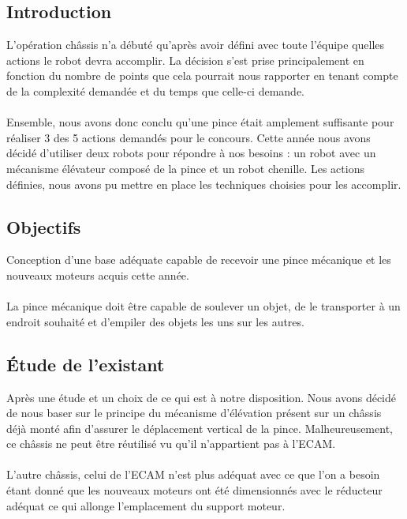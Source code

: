 \subsection{Introduction}
L'opération châssis n'a débuté qu'après avoir défini avec toute l'équipe quelles actions le robot devra accomplir. La décision s'est prise principalement en fonction du nombre de points que cela pourrait nous rapporter en tenant compte de la complexité demandée et du temps que celle-ci demande. 

\paragraph{}
Ensemble, nous avons donc conclu qu'une pince était amplement suffisante pour réaliser 3 des 5 actions demandés pour le concours. Cette année nous avons décidé d'utiliser deux robots pour répondre à nos besoins : un robot avec un mécanisme élévateur composé de la pince et un robot chenille. Les actions définies, nous avons pu mettre en place les techniques choisies pour les accomplir.

\subsection{Objectifs}
Conception d'une base adéquate capable de recevoir une pince mécanique et les nouveaux moteurs acquis cette année. 

\paragraph{}
La pince mécanique doit être capable de soulever un objet, de le transporter à un endroit souhaité et d'empiler des objets les uns sur les autres.

\subsection{Étude de l'existant}
Après une étude et un choix de ce qui est à notre disposition. Nous avons décidé de nous baser sur le principe du mécanisme d'élévation présent sur un châssis déjà monté afin d'assurer le déplacement vertical de la pince. Malheureusement, ce châssis ne peut être réutilisé vu qu'il n'appartient pas à l'ECAM.

\paragraph{}
L'autre châssis, celui de l'ECAM n'est plus adéquat avec ce que l'on a besoin étant donné que les nouveaux moteurs ont été dimensionnés avec le réducteur adéquat ce qui allonge l'emplacement du support moteur.

